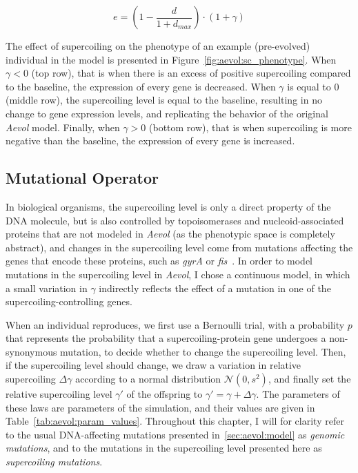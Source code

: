 \begin{equation}
e = (1 - \frac{d}{1+d_{max}}) \cdot (1 + \gamma)
\label{eq:aevol:sc}
\end{equation}

The effect of supercoiling on the phenotype of an example (pre-evolved) individual in the model is presented in Figure~\ref{fig:aevol:sc_phenotype}.
When $\gamma < 0$ (top row), that is when there is an excess of positive supercoiling compared to the baseline, the expression of every gene is decreased.
When $\gamma$ is equal to 0 (middle row), the supercoiling level is equal to the baseline, resulting in no change to gene expression levels, and replicating the behavior of the original \emph{Aevol} model.
Finally, when $\gamma > 0$ (bottom row), that is when supercoiling is more negative than the baseline, the expression of every gene is increased.

\subsection{Mutational Operator}
\label{sec:aevol:mut-sc}

In biological organisms, the supercoiling level is only a direct property of the DNA molecule, but is also controlled by topoisomerases and nucleoid-associated proteins that are not modeled in \emph{Aevol} (as the phenotypic space is completely abstract), and changes in the supercoiling level come from mutations affecting the genes that encode these proteins, such as \emph{gyrA} or \emph{fis}~\citep{crozat2005}.
In order to model mutations in the supercoiling level in \emph{Aevol}, I chose a continuous model, in which a small variation in $\gamma$ indirectly reflects the effect of a mutation in one of the supercoiling-controlling genes.

When an individual reproduces, we first use a Bernoulli trial, with a probability $p$ that represents the probability that a supercoiling-protein gene undergoes a non-synonymous mutation, to decide whether to change the supercoiling level.
Then, if the supercoiling level should change, we draw a variation in relative supercoiling $\Delta\gamma$ according to a normal distribution $\mathcal{N}(0, s^2)$, and finally set the relative supercoiling level $\gamma'$ of the offspring to $\gamma' = \gamma + \Delta\gamma$.
The parameters of these laws are parameters of the simulation, and their values are given in Table~\ref{tab:aevol:param_values}.
Throughout this chapter, I will for clarity refer to the usual DNA-affecting mutations presented in~\ref{sec:aevol:model} as \emph{genomic mutations}, and to the mutations in the supercoiling level presented here as \emph{supercoiling mutations}.


